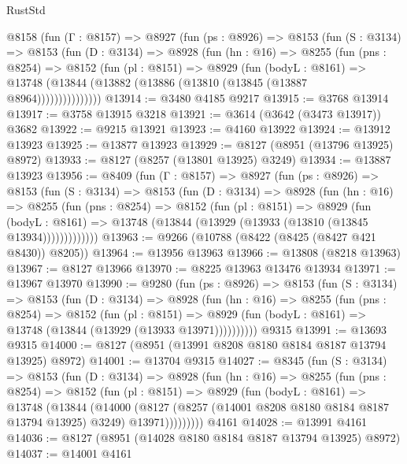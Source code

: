 \begin{lexlean}{RustStd}
\begin{coremodule}
    @8158
      (fun (Γ : @8157) =>
      @8927
        (fun (ps : @8926) =>
        @8153
          (fun (S : @3134) =>
          @8153
            (fun (D : @3134) =>
            @8928
              (fun (hn : @16) =>
              @8255
                (fun (pns : @8254) =>
                @8152
                  (fun (pl : @8151) =>
                  @8929
                    (fun (bodyL : @8161) =>
                    @13748 (@13844 (@13882 (@13886 (@13810 (@13845 (@13887 @8964)))))))))))))))
@13914 := @3480 @4185 @9217
@13915 := @3768 @13914
@13917 := @3758 @13915 @3218
@13921 := @3614 (@3642 (@3473 @13917)) @3682
@13922 := @9215 @13921
@13923 := @4160 @13922
@13924 := @13912 @13923
@13925 := @13877 @13923
@13929 := @8127 (@8951 (@13796 @13925) @8972)
@13933 := @8127 (@8257 (@13801 @13925) @3249)
@13934 := @13887 @13923
@13956 := @8409
    (fun (Γ : @8157) =>
    @8927
      (fun (ps : @8926) =>
      @8153
        (fun (S : @3134) =>
        @8153
          (fun (D : @3134) =>
          @8928
            (fun (hn : @16) =>
            @8255
              (fun (pns : @8254) =>
              @8152
                (fun (pl : @8151) =>
                @8929
                  (fun (bodyL : @8161) =>
                  @13748 (@13844 (@13929 (@13933 (@13810 (@13845 @13934)))))))))))))
@13963 := @9266 (@10788 (@8422 (@8425 (@8427 @421 @8430)) @8205))
@13964 := @13956 @13963
@13966 := @13808 (@8218 @13963)
@13967 := @8127 @13966
@13970 := @8225 @13963 @13476 @13934
@13971 := @13967 @13970
@13990 := @9280
    (fun (ps : @8926) =>
    @8153
      (fun (S : @3134) =>
      @8153
        (fun (D : @3134) =>
        @8928
          (fun (hn : @16) =>
          @8255
            (fun (pns : @8254) =>
            @8152
              (fun (pl : @8151) =>
              @8929 (fun (bodyL : @8161) => @13748 (@13844 (@13929 (@13933 @13971))))))))))
    @9315
@13991 := @13693 @9315
@14000 := @8127 (@8951 (@13991 @8208 @8180 @8184 @8187 @13794 @13925) @8972)
@14001 := @13704 @9315
@14027 := @8345
    (fun (S : @3134) =>
    @8153
      (fun (D : @3134) =>
      @8928
        (fun (hn : @16) =>
        @8255
          (fun (pns : @8254) =>
          @8152
            (fun (pl : @8151) =>
            @8929
              (fun (bodyL : @8161) =>
              @13748
                (@13844
                  (@14000
                    (@8127
                      (@8257 (@14001 @8208 @8180 @8184 @8187 @13794 @13925) @3249)
                      @13971)))))))))
    @4161
@14028 := @13991 @4161
@14036 := @8127 (@8951 (@14028 @8180 @8184 @8187 @13794 @13925) @8972)
@14037 := @14001 @4161

\end{coremodule}
\end{lexlean}
